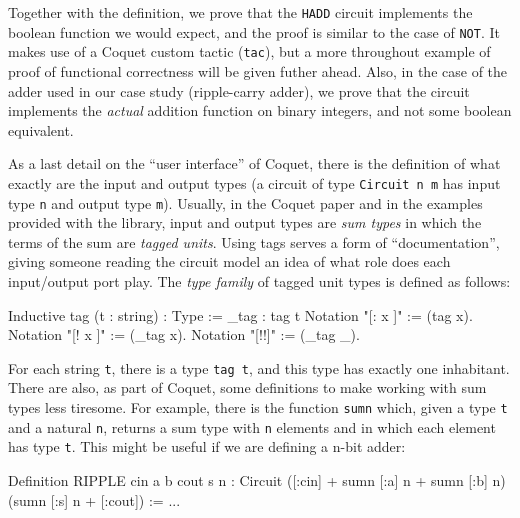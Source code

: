             Together with the definition, we prove that the \texttt{HADD} circuit implements the
            boolean function we would expect, and the proof is similar to the case of \texttt{NOT}.
            It makes use of a Coquet custom tactic (\texttt{tac}), but a more throughout example of
            proof of functional correctness will be given futher ahead.  Also, in the case of the
            adder used in our case study (ripple-carry adder), we prove that the circuit implements
            the \emph{actual} addition function on binary integers, and not some boolean equivalent.

            As a last detail on the ``user interface'' of Coquet, there is the definition of what
            exactly are the input and output types (a circuit of type \texttt{Circuit n m} has input
            type \texttt{n} and output type \texttt{m}). Usually, in the Coquet
            paper\cite{coquet2011} and in the examples provided with the library, input and output
            types are \emph{sum types} in which the terms of the sum are \emph{tagged units}. Using
            tags serves a form of ``documentation'', giving someone reading the circuit model an
            idea of what role does each input/output port play. The \emph{type family} of tagged
            unit types is defined as follows:

            \begin{coqcode}
        Inductive tag (t : string) : Type := _tag : tag t
        Notation "[: x ]" := (tag x).
        Notation "[! x ]" := (_tag x).
        Notation "[!!]"   := (_tag _).
            \end{coqcode}

            For each string \texttt{t}, there is a type \texttt{tag t}, and this type has exactly
            one inhabitant. There are also, as part of Coquet, some definitions to make working with
            sum types less tiresome. For example, there is the function \texttt{sumn} which, given a
            type \texttt{t} and a natural \texttt{n}, returns a sum type with \texttt{n} elements
            and in which each element has type \texttt{t}.  This might be useful if we are defining
            a n-bit adder:

            \begin{coqcode}
        Definition RIPPLE cin a b cout s n :
            Circuit  ([:cin] + sumn [:a] n + sumn [:b] n)  (sumn [:s] n + [:cout]) := ...
            \end{coqcode}

